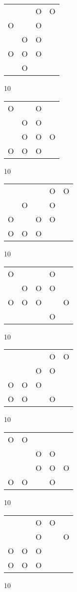 \begin{tabular}{|m{0.2cm}m{0.2cm}m{0.2cm}m{0.2cm}|}\hline
 & &O&O\\
O& &O& \\
 &O&O& \\
O&O&O& \\
 &O& & \\
\hline\end{tabular}10
\begin{tabular}{|m{0.2cm}m{0.2cm}m{0.2cm}m{0.2cm}|}\hline
O& &O& \\
 &O&O& \\
 &O&O&O\\
O&O&O& \\
\hline\end{tabular}10
\begin{tabular}{|m{0.2cm}m{0.2cm}m{0.2cm}m{0.2cm}m{0.2cm}|}\hline
 & & &O&O\\
 &O& &O& \\
O& &O&O& \\
O&O&O& & \\
\hline\end{tabular}10
\begin{tabular}{|m{0.2cm}m{0.2cm}m{0.2cm}m{0.2cm}m{0.2cm}|}\hline
O& & &O& \\
 &O&O&O& \\
O&O&O& &O\\
 & & &O& \\
\hline\end{tabular}10
\begin{tabular}{|m{0.2cm}m{0.2cm}m{0.2cm}m{0.2cm}m{0.2cm}|}\hline
 & & &O&O\\
 & &O&O& \\
O&O&O& & \\
O&O& &O& \\
\hline\end{tabular}10
\begin{tabular}{|m{0.2cm}m{0.2cm}m{0.2cm}m{0.2cm}m{0.2cm}|}\hline
O&O& & & \\
 & &O&O& \\
 & &O&O&O\\
O&O& &O& \\
\hline\end{tabular}10
\begin{tabular}{|m{0.2cm}m{0.2cm}m{0.2cm}m{0.2cm}m{0.2cm}|}\hline
 & &O&O& \\
 & &O& &O\\
O&O&O& & \\
O&O&O& & \\
\hline\end{tabular}10
